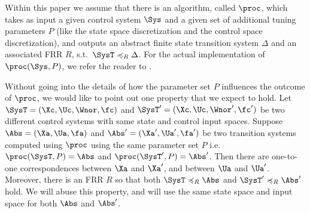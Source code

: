 %
%
Within this paper we assume that there is an algorithm, called $\proc$, which takes as input a given control system $\Sys$ and a given set of additional tuning parameters $P$ (like the state space discretization and the control space discretization), and outputs an abstract finite state transition system $\Delta$ and an associated FRR $R$, s.t.\ $\SysT\preccurlyeq_R \Delta$.
For the actual implementation of $\proc(\Sys,P)$, we refer the reader to \cite{ReissigWeberRungger_2017_FRR}.

Without going into the details of how the parameter set $P$ influences the outcome of $\proc$, we would like to point out one property that we expect to hold.
Let $\SysT=(\Xc,\Uc,\Wnor,\fc)$ and $\SysT'=(\Xc,\Uc,\Wnor',\fc')$ be two different control systems with same state and control input spaces.
Suppose $\Abs=(\Xa,\Ua,\fa)$ and $\Abs'=(\Xa',\Ua',\fa')$ be two transition systems computed using $\proc$ using the same parameter set $P$ i.e.\ $\proc(\SysT,P)=\Abs$ and $\proc(\SysT',P)=\Abs'$.
Then there are one-to-one correspondences between $\Xa$ and $\Xa'$, and between $\Ua$ and $\Ua'$.
Moreover, there is an FRR $R$ so that both $\SysT\preccurlyeq_R \Abs$ and $\SysT'\preccurlyeq_R \Abs'$ hold.
We will abuse this property, and will use the same state space and input space for both $\Abs$ and $\Abs'$.

